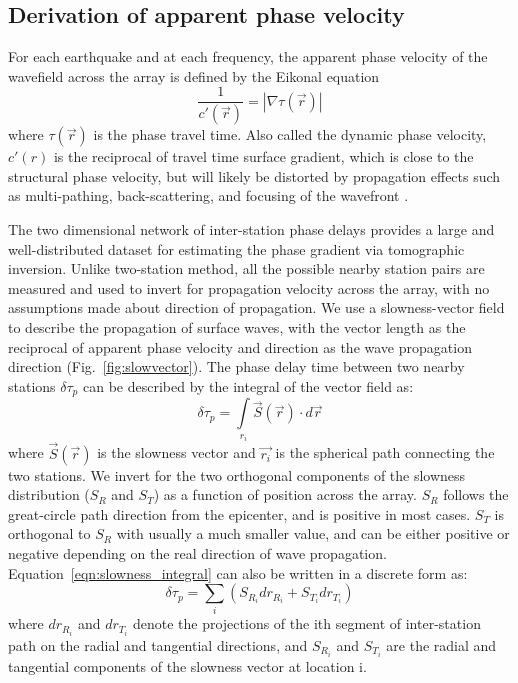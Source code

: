 \subsection{Derivation of apparent phase velocity}
\label{sec:apv}

For each earthquake and at each frequency, the apparent phase velocity of the wavefield across the array is defined by the Eikonal equation 
\begin{equation}
	\frac{1}{c'(\vec{r})} = |\nabla \tau(\vec{r})|
\end{equation}
where $\tau(\vec{r})$ is the phase travel time. Also called the dynamic phase velocity, $c'(r)$ is the reciprocal of travel time surface gradient, which is close to the structural phase velocity, but will likely be distorted by propagation effects such as multi-pathing, back-scattering, and focusing of the wavefront \citep{Lin:2009fx}.  

The two dimensional network of inter-station phase delays provides a large and well-distributed dataset for estimating the phase gradient via tomographic inversion. 
Unlike two-station method, all the possible nearby station pairs are measured and used to invert for propagation velocity across the array, with no assumptions made about direction of propagation. We use a slowness-vector field to describe the propagation of surface waves, with the vector length as the reciprocal of apparent phase velocity and direction as the wave propagation direction (Fig.~\ref{fig:slowvector}).
The phase delay time between two nearby stations $\delta \tau_p$ can be described by the integral of the vector field as:
\begin{equation}
	\delta \tau_p = \int\limits_{r_i} \vec{S}(\vec{r}) \cdot d\vec{r}
	\label{eqn:slowness_integral}
\end{equation}
where $\vec{S}(\vec{r})$ is the slowness vector and $\vec{r_i}$ is the spherical path connecting the two stations. We invert for the two orthogonal components of the slowness distribution ($S_R$ and $S_T$) as a function of position across the array. $S_R$ follows the great-circle path direction from the epicenter, and is positive in most cases. $S_T$ is orthogonal to $S_R$ with usually a much smaller value, and can be either positive or negative depending on the real direction of wave propagation.
Equation~\ref{eqn:slowness_integral} can also be written in a discrete form as:
\begin{equation}
	\delta \tau_p = \sum_i (S_{R_i}dr_{R_i} + S_{T_i}dr_{T_i})
	\label{eqn:slowness_discrete}
\end{equation}
where $dr_{R_i}$ and $dr_{T_i}$ denote the projections of the ith segment of inter-station path on the radial and tangential directions, and $S_{R_i}$ and $S_{T_i}$ are the radial and tangential components of the slowness vector at location i.


